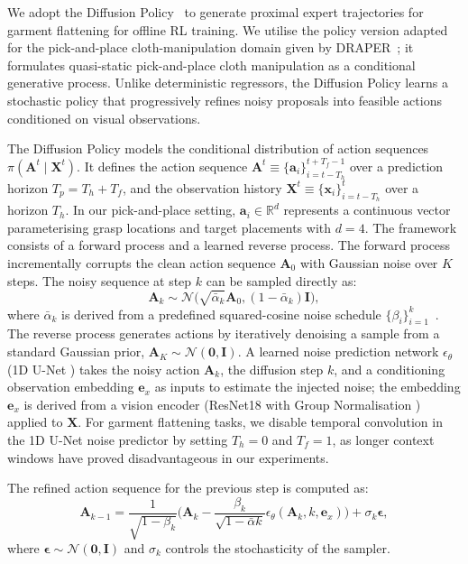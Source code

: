 \documentclass[journal]{IEEEtran}
\begin{document}
We adopt the Diffusion Policy~\cite{chi2023diffusionpolicy} to generate proximal expert trajectories for garment flattening for offline RL training. We utilise the policy version adapted for the pick-and-place cloth-manipulation domain given by \textsc{DRAPER}~\cite{kadi2025draper}; it formulates quasi-static pick-and-place cloth manipulation as a conditional generative process. Unlike deterministic regressors, the Diffusion Policy learns a stochastic policy that progressively refines noisy proposals into feasible actions conditioned on visual observations.

The Diffusion Policy models the conditional distribution of action sequences $\pi(\bm{A}^t \mid \bm{X}^t)$. It defines the action sequence $\bm{A}^t \equiv \{\bm{a}_i\}_{i=t-T_h}^{t+T_f-1}$ over a prediction horizon $T_p = T_h + T_f$, and the observation history $\bm{X}^t \equiv \{\bm{x}_i\}_{i=t-T_h}^{t}$ over a horizon $T_h$. In our pick-and-place setting, $\bm{a}_i \in \mathbb{R}^d$ represents a continuous vector parameterising grasp locations and target placements with $d=4$.
The framework consists of a forward process and a learned reverse process. The forward process incrementally corrupts the clean action sequence $\bm{A}_0$ with Gaussian noise over $K$ steps. The noisy sequence at step $k$ can be sampled directly as:
\begin{equation}
\bm{A}_k \sim \mathcal{N}\big(\sqrt{\bar{\alpha}_k}\bm{A}_0, (1 - \bar{\alpha}_k)\bm{I}\big),
\end{equation}
where $\bar{\alpha}_k$ is derived from a predefined squared-cosine noise schedule $\{\beta_i\}_{i=1}^k$~\cite{nichol2021improved}.
The reverse process generates actions by iteratively denoising a sample from a standard Gaussian prior, $\bm{A}_K \sim \mathcal{N}(\bm{0}, \bm{I})$. A learned noise prediction network $\epsilon_\theta$ (1D U-Net \cite{ronneberger2015u}) takes the noisy action $\bm{A}_k$, the diffusion step $k$, and a conditioning observation embedding $\bm{e}_x$ as inputs to estimate the injected noise; the embedding $\bm{e}_x$ is derived from a vision encoder (ResNet18 \cite{he2016deep} with Group Normalisation \cite{wu2018group}) applied to $\bm{X}$. For garment flattening tasks, we disable temporal convolution in the 1D U-Net noise predictor by setting $T_h = 0$ and $T_f = 1$, as longer context windows have proved disadvantageous in our experiments.

The refined action sequence for the previous step is computed as:
\begin{equation}
\bm{A}_{k-1} =
\frac{1}{\sqrt{1 - \beta_k}}
\Big(
\bm{A}_k -
\frac{\beta_k}{\sqrt{1 - \bar{\alpha}k}}
\epsilon_\theta(\bm{A}_k, k, \bm{e}_x)
\Big)
+ \sigma_k \boldsymbol{\epsilon},
\end{equation}
where $\boldsymbol{\epsilon} \sim \mathcal{N}(\bm{0}, \bm{I})$ and $\sigma_k$ controls the stochasticity of the sampler.
\end{document}
